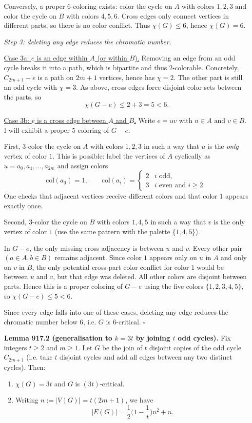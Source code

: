 Conversely, a proper $6$-coloring exists: color the cycle on $A$ with colors $1,2,3$ and color the cycle on $B$ with colors $4,5,6$. Cross edges only connect vertices in different parts, so there is no color conflict. Thus $\chi(G)\le 6$, hence $\chi(G)=6$.

\emph{Step 3: deleting any edge reduces the chromatic number.}

\smallskip
\noindent\underline{Case 3a: $e$ is an edge within $A$ (or within $B$).}  Removing an edge from an odd cycle breaks it into a path, which is bipartite and thus $2$-colorable. Concretely, $C_{2m+1}-e$ is a path on $2m+1$ vertices, hence has $\chi=2$. The other part is still an odd cycle with $\chi=3$. As above, cross edges force disjoint color sets between the parts, so
\[
\chi(G-e) \le 2+3=5<6.
\]

\smallskip
\noindent\underline{Case 3b: $e$ is a cross edge between $A$ and $B$.}  Write $e=uv$ with $u\in A$ and $v\in B$. I will exhibit a proper $5$-coloring of $G-e$.

First, 3-color the cycle on $A$ with colors $1,2,3$ in such a way that $u$ is the \emph{only} vertex of color $1$. This is possible: label the vertices of $A$ cyclically as $u=a_0,a_1,\dots,a_{2m}$ and assign colors
\[
\mathrm{col}(a_0)=1,\qquad \mathrm{col}(a_i)=\begin{cases}2 & i\text{ odd},\\ 3 & i\text{ even and }i\ge 2.
\end{cases}
\]
One checks that adjacent vertices receive different colors and that color $1$ appears exactly once.

Second, 3-color the cycle on $B$ with colors $1,4,5$ in such a way that $v$ is the only vertex of color $1$ (use the same pattern with the palette $\{1,4,5\}$).

In $G-e$, the only missing cross adjacency is between $u$ and $v$. Every other pair $(a\in A, b\in B)$ remains adjacent. Since color $1$ appears only on $u$ in $A$ and only on $v$ in $B$, the only potential cross-part color conflict for color $1$ would be between $u$ and $v$, but that edge was deleted. All other colors are disjoint between parts. Hence this is a proper coloring of $G-e$ using the five colors $\{1,2,3,4,5\}$, so $\chi(G-e)\le 5<6$.

Since every edge falls into one of these cases, deleting any edge reduces the chromatic number below $6$, i.e. $G$ is $6$-critical. \hfill$\square$

\medskip
\noindent\textbf{Lemma 917.2 (generalisation to $k=3t$ by joining $t$ odd cycles).}  Fix integers $t\ge 2$ and $m\ge 1$. Let $G$ be the join of $t$ disjoint copies of the odd cycle $C_{2m+1}$ (i.e. take $t$ disjoint cycles and add all edges between any two distinct cycles). Then:
\begin{enumerate}
\item[(a)] $\chi(G)=3t$ and $G$ is $(3t)$-critical.
\item[(b)] Writing $n:=|V(G)|=t(2m+1)$, we have
\[
|E(G)|=\frac12\Big(1-\frac{1}{t}\Big)n^2 + n.
\]
\end{enumerate}


